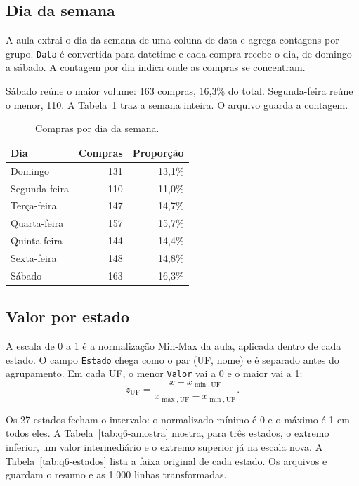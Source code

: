 \balance
\subsection{Dia da semana}

A aula extrai o dia da semana de uma coluna de data e agrega contagens por grupo. \texttt{Data} é convertida para datetime e cada compra recebe o dia, de domingo a sábado. A contagem por dia indica onde as compras se concentram.

Sábado reúne o maior volume: 163 compras, 16,3\% do total. Segunda-feira reúne o menor, 110. A Tabela~\ref{tab:q6-dias} traz a semana inteira. O arquivo  guarda a contagem.

\begin{table}[H]
    \centering
    \caption{Compras por dia da semana.}
    \label{tab:q6-dias}
    \footnotesize
    \setlength{\tabcolsep}{10pt}
    \begin{tabular}{@{}lrr@{}}
        \toprule
        Dia & Compras & Proporção \\
        \midrule
        Domingo       & 131 & 13,1\% \\
        Segunda-feira & 110 & 11,0\% \\
        Terça-feira   & 147 & 14,7\% \\
        Quarta-feira  & 157 & 15,7\% \\
        Quinta-feira  & 144 & 14,4\% \\
        Sexta-feira   & 148 & 14,8\% \\
        Sábado        & 163 & 16,3\% \\
        \bottomrule
    \end{tabular}
\end{table}

\subsection{Valor por estado}

A escala de 0 a 1 é a normalização Min-Max da aula, aplicada dentro de cada estado. O campo \texttt{Estado} chega como o par (UF, nome) e é separado antes do agrupamento. Em cada UF, o menor \texttt{Valor} vai a 0 e o maior vai a 1:
\[
z_{\mathrm{UF}} = \frac{x - x_{\min,\mathrm{UF}}}{x_{\max,\mathrm{UF}} - x_{\min,\mathrm{UF}}}.
\]

Os 27 estados fecham o intervalo: o normalizado mínimo é 0 e o máximo é 1 em todos eles. A Tabela~\ref{tab:q6-amostra} mostra, para três estados, o extremo inferior, um valor intermediário e o extremo superior já na escala nova. A Tabela~\ref{tab:q6-estados} lista a faixa original de cada estado. Os arquivos  e  guardam o resumo e as 1.000 linhas transformadas.

